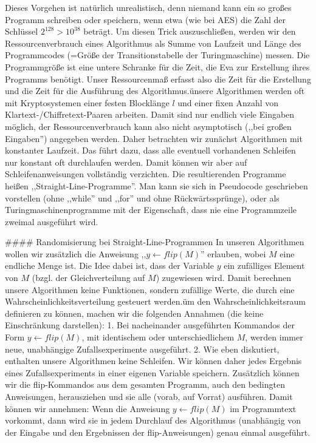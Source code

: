 \documentclass[a4paper]{article}
\begin{document}
\begin{multicols}{3}
        Dieses Vorgehen ist natürlich unrealistisch, denn niemand kann ein so großes Programm schreiben oder speichern, wenn etwa (wie bei AES) die Zahl der Schlüssel $2^{128}>10^{38}$ beträgt. Um diesen Trick auszuschließen, werden wir den Ressourcenverbrauch eines Algorithmus als Summe von Laufzeit und Länge des Programmcodes (=Größe der Transitionstabelle der Turingmaschine) messen. Die Programmgröße ist eine untere Schranke für die Zeit, die Eva zur Erstellung ihres Programms benötigt. Unser Ressourcenmaß erfasst also die Zeit für die Erstellung und die Zeit für die Ausführung des Algorithmus.ünsere Algorithmen werden oft mit Kryptosystemen einer festen Blocklänge $l$ und einer fixen Anzahl von Klartext-/Chiffretext-Paaren arbeiten. Damit sind nur endlich viele Eingaben möglich, der Ressourcenverbrauch kann also nicht asymptotisch (,,bei großen Eingaben'') angegeben werden. Daher betrachten wir zunächst Algorithmen mit konstanter Laufzeit. Das führt dazu, dass alle eventuell vorhandenen Schleifen nur konstant oft durchlaufen werden. Damit können wir aber auf Schleifenanweisungen vollständig verzichten. Die resultierenden Programme heißen ,,Straight-Line-Programme''. Man kann sie sich in Pseudocode geschrieben vorstellen (ohne ,,while'' und ,,for'' und ohne Rückwärtssprünge), oder als Turingmaschinenprogramme mit der Eigenschaft, dass nie eine Programmzeile zweimal ausgeführt wird.

        #### Randomisierung bei Straight-Line-Programmen
        In unseren Algorithmen wollen wir zusätzlich die Anweisung ,,$y\leftarrow flip(M)$'' erlauben, wobei $M$ eine endliche Menge ist. Die Idee dabei ist, dass der Variable $y$ ein zufälliges Element von $M$ (bzgl. der Gleichverteilung auf $M$) zugewiesen wird. Damit berechnen unsere Algorithmen keine Funktionen, sondern zufällige Werte, die durch eine Wahrscheinlichkeitsverteilung gesteuert werden.üm den Wahrscheinlichkeitsraum definieren zu können, machen wir die folgenden Annahmen (die keine Einschränkung darstellen):
        1. Bei nacheinander ausgeführten Kommandos der Form $y\leftarrow flip(M)$, mit identischem oder unterschiedlichem $M$, werden immer neue, unabhängige Zufallsexperimente ausgeführt.
        2. Wie eben diskutiert, enthalten unsere Algorithmen keine Schleifen. Wir können daher jedes Ergebnis eines Zufallsexperiments in einer eigenen Variable speichern. Zusätzlich können wir die flip-Kommandos aus dem gesamten Programm, auch den bedingten Anweisungen, herausziehen und sie alle (vorab, auf Vorrat) ausführen. Damit können wir annehmen: Wenn die Anweisung $y\leftarrow flip(M)$ im Programmtext vorkommt, dann wird sie in jedem Durchlauf des Algorithmus (unabhängig von der Eingabe und den Ergebnissen der flip-Anweisungen) genau einmal ausgeführt.


\end{multicols}
\end{document}
